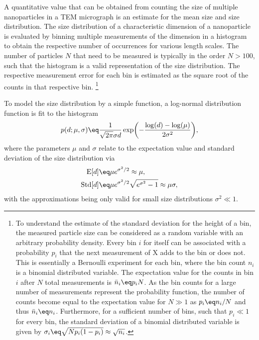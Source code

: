 \documentclass[\main/dresen_thesis.tex]{subfiles}
\begin{document}
      A quantitative value that can be obtained from counting the size of multiple nanoparticles in a TEM micrograph is an estimate for the mean size and size distribution.
      The size distribution of a characteristic dimension of a nanoparticle is evaluated by binning multiple measurements of the dimension in a histogram to obtain the respective number of occurrences for various length scales.
      The number of particles $N$ that need to be measured is typically in the order $N > 100$, such that the histogram is a valid representation of the size distribution.
      The respective measurement error for each bin is estimated as the square root of the counts in that respective bin. \footnote{To understand the estimate of the standard deviation for the height of a bin, the measured particle size can be considered as a random variable with an arbitrary probability density.
      Every bin $i$ for itself can be associated with a probability $p_i$ that the next measurement of X adds to the bin or does not.
      This is essentially a Bernoulli experiment for each bin, where the bin count $n_i$ is a binomial distributed variable.
      The expectation value for the counts in bin $i$ after $N$ total measurements is $\bar{n}_i \eq p_i N$.
      As the bin counts for a large number of measurements represent the probability function, the number of counts become equal to the expectation value for $N \gg 1$ as $p_i \eq n_i / N$ and thus $\bar{n}_i \eq n_i$.
      Furthermore, for a sufficient number of bins, such that $p_i \ll 1$ for every bin, the standard deviation of a binomial distributed variable is given by $\sigma_i \eq \sqrt{N p_i (1-p_i)} \approx \sqrt{n_i}$.}

      To model the size distribution by a simple function, a log-normal distribution function is fit to the histogram
      \begin{align}\label{eq:looselyPackedNP:nanoparticle:lognormalDist}
        p(d; \mu, \sigma) \eq \frac{1}{\sqrt{2\pi} \sigma d} \exp \biggl( - \frac{\log(d) - \log(\mu)}{2 \sigma^2} \biggr),
      \end{align}
      where the parameters $\mu$ and $\sigma$ relate to the expectation value and standard deviation of the size distribution via
      \begin{align}
        \mathrm{E}[d] \eq& \mu e^{\sigma^2/2} \approx \mu,\\
        \mathrm{Std}[d] \eq& \mu e^{\sigma^2/2} \sqrt{e^{\sigma^2} - 1} \approx \mu \sigma,\\
      \end{align}
      with the approximations being only valid for small size distributions $\sigma^2 \ll 1$.
\end{document}
